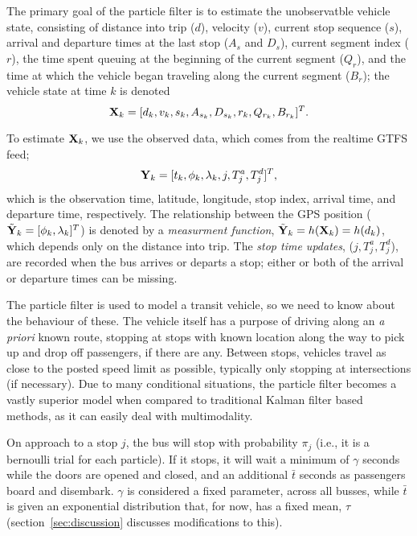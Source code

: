 \documentclass[draftcls,a4paper,onecolumn]{IEEEtran}\usepackage[]{graphicx}\usepackage[]{color}
\begin{document}
The primary goal of the particle filter is to estimate the unobservatble
vehicle state,
consisting of distance into trip ($d$), velocity ($v$),
current stop sequence ($s$), 
arrival and departure times at the last stop ($A_s$ and $D_s$),
current segment index ($r$),
the time spent queuing at the beginning of the current segment ($Q_r$),
and the time at which the vehicle began traveling along the current segment ($B_r$);
the vehicle state at time $k$ is denoted
\begin{equation}
  \label{eq:vehiclestate}
  \mathbf{X}_k = [d_k, v_k, s_k, A_{s_k}, D_{s_k}, r_k, Q_{r_k}, B_{r_k}]^T.
\end{equation}

To estimate $\mathbf{X}_k$, we use the observed data,
which comes from the realtime GTFS feed;
\begin{equation}
  \label{eq:data}
  \mathbf{Y}_k = [t_k, \phi_k, \lambda_k, j, T_j^a, T_j^d]^T,
\end{equation}
which is the observation time, latitude, longitude, stop index,
arrival time, and departure time, respectively.
The relationship between the GPS position ($\tilde {\mathbf{Y}}_k = [\phi_k, \lambda_k]^T$)
is denoted by a \emph{measurment function}, $\tilde{\mathbf{Y}}_k = h(\mathbf{X}_k) = h(d_k)$,
which depends only on the distance into trip.
The \emph{stop time updates}, ($j, T^a_j , T^d_j$),
are recorded when the bus arrives or departs a stop;
either or both of the arrival or departure times can be missing.


The particle filter is used to model a transit vehicle,
so we need to know about the behaviour of these.
The vehicle itself has a purpose of driving along an \emph{a priori} known route,
stopping at stops with known location along the way to pick up
and drop off passengers, if there are any.
Between stops, vehicles travel as close to the posted speed limit as possible,
typically only stopping at intersections (if necessary).
Due to many conditional situations, 
the particle filter becomes a vastly superior model when compared to traditional
Kalman filter based methods, 
as it can easily deal with multimodality.

On approach to a stop $j$, the bus will stop with probability $\pi_j$ 
(i.e., it is a bernoulli trial for each particle).
If it stops, it will wait a minimum of $\gamma$ seconds while the doors are opened and closed,
and an additional $\bar t$ seconds as passengers board and disembark.
$\gamma$ is considered a fixed parameter, across all busses, 
while $\bar t$ is given an exponential distribution that, for now, has a fixed mean, $\tau$
(section~\ref{sec:discussion} discusses modifications to this).
\end{document}
